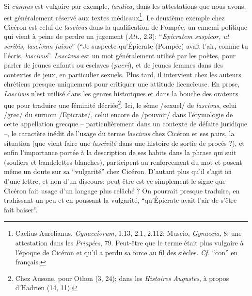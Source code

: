 Si \textit{cunnus} est vulgaire par exemple, \textit{landica}, dans les attestations que nous avons, est généralement réservé aux textes médicaux\footnote{Caelius Aurelianus, \textit{Gynaeciorum}, 1.13, 2.1, 2.112; Muscio, \textit{Gynaecia}, 8; une attestation dans les \textit{Priapées}, 79. Peut-être que le terme était plus vulgaire à l'époque de Cicéron et qu'il a perdu sa force au fil des siècles. \textit{Cf.} \enquote{con} en français.}. Le deuxième exemple chez Cicéron est celui de \textit{lascivus} dans la qualification de Pompée, un ennemi politique qui vient à peine de perdre un jugement (\textit{Att.}, 2.3): \enquote{\textit{Epicratem suspicor, ut scribis, lascivum fuisse}} (\enquote{Je suspecte qu'Épicrate (Pompée) avait l'air, comme tu l'écris, \textit{lascivus}}. \textit{Lascivus} est un mot généralement utilisé par les poètes, pour parler de jeunes enfants ou esclaves (\textit{pueri}), et de jeunes femmes dans des contextes de jeux, en particulier sexuels. Plus tard, il intervient chez les auteurs chrétiens presque uniquement pour critiquer une attitude licencieuse. En prose, \textit{Lascivus} n'est utilisé dans les genres historiques et dans la bouche des orateurs que pour traduire une féminité décriée\footnote{Chez Ausone, pour Othon (3, 24); dans les \textit{Histoires Augustes}, à propos d'Hadrien (14, 11).}. Ici, le sème /sexuel/ de \textit{lascivus}, celui /grec/ du surnom /Epicrate/, celui encore de /pouvoir/ dans l'étymologie de cette appellation grecque -- particulièrement dans un contexte de défaite juridique --, le caractère inédit de l'usage du terme \textit{lascivus} chez Cicéron et ses pairs, la situation (que vient faire une \textit{lascivité} dans une histoire de sortie de procés ?), et enfin l'importance portée à la description de ses habits dans la phrase qui suit (souliers et bandelettes blanches), participent au renforcement du mot et posent même un doute sur sa \enquote{vulgarité} chez Cicéron. D'autant plus qu'il s'agit ici d'une lettre, et non d'un discours: peut-être est-ce simplement le signe que Cicéron fait usage d'un langage plus relâché ? On pourrait presque traduire, en trahissant un peu et en poussant la vulgarité, \enquote{qu'Épicrate avait l'air de s'être fait baiser}.

